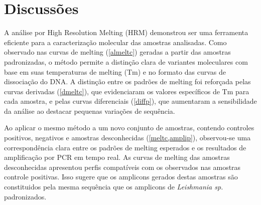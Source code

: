 \section{Discussões}
A análise por High Resolution Melting (HRM) demonstrou ser
uma ferramenta eficiente para a caracterização molecular das amostras
analisadas. Como observado nas curvas de melting (\cref{almeltc}) geradas a
partir das amostras padronizadas, o método permite a distinção clara de
variantes moleculares com base em suas temperaturas de melting (Tm) e no formato
das curvas de dissociação do DNA. A distinção entre os padrões de melting foi
reforçada pelas curvas derivadas (\cref{dmeltc}), que evidenciaram os valores
específicos de Tm para cada amostra, e pelas curvas diferenciais (\cref{diffp}),
que aumentaram a sensibilidade da análise ao destacar pequenas variações de
sequência.

Ao aplicar o mesmo método a um novo conjunto de amostras, contendo controles
positivos, negativos e amostras desconhecidas (\cref{meltc,amplip}), observou-se
uma correspondência clara entre os padrões de melting esperados e os resultados
de amplificação por PCR em tempo real. As curvas de melting das
amostras desconhecidas apresentou perfis compatíveis com os observados nas
amostras controle positivas. Isso sugere que os amplicons gerados destas
amostras são constituidos pela mesma sequência que os amplicons de
\textit{Leishmania sp.} padronizados. 

